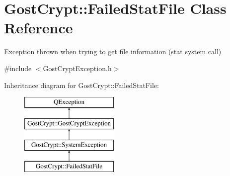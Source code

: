 \hypertarget{class_gost_crypt_1_1_failed_stat_file}{}\section{Gost\+Crypt\+:\+:Failed\+Stat\+File Class Reference}
\label{class_gost_crypt_1_1_failed_stat_file}


Exception thrown when trying to get file information (stat system call)  




{\ttfamily \#include $<$Gost\+Crypt\+Exception.\+h$>$}

Inheritance diagram for Gost\+Crypt\+:\+:Failed\+Stat\+File\+:\begin{figure}[H]
\begin{center}
\leavevmode
\includegraphics[height=4.000000cm]{class_gost_crypt_1_1_failed_stat_file}
\end{center}
\end{figure}
